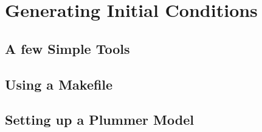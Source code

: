 \chapter{Generating Initial Conditions}

\section{A few Simple Tools}




\section{Using a Makefile}


\section{Setting up a Plummer Model}




